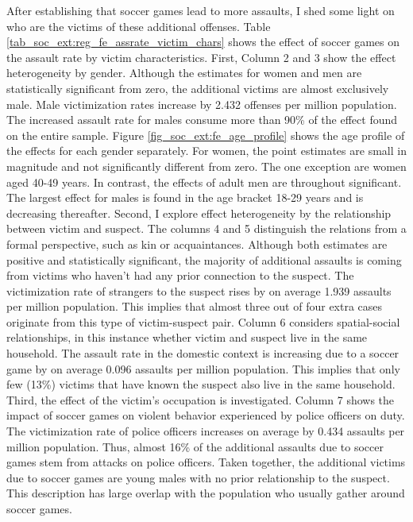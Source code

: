 \documentclass[11pt, a4paper]{article} %
\begin{document}
After establishing that soccer games lead to more assaults, I shed some light on who are the victims of these additional offenses. Table \ref{tab_soc_ext:reg_fe_assrate_victim_chars} shows the effect of soccer games on the assault rate by victim characteristics. First, Column 2 and 3 show the effect heterogeneity by gender. Although the estimates for women and men are statistically significant from zero, the additional victims are almost exclusively male. Male victimization rates increase by 2.432 offenses per million population. The increased assault rate for males consume more than 90\% of the effect found on the entire sample. Figure \ref{fig_soc_ext:fe_age_profile} shows the age profile of the effects for each gender separately. For women, the point estimates are small in magnitude and not significantly different from zero. The one exception are women aged 40-49 years. In contrast, the effects of adult men are throughout significant. The largest effect for males is found in the age bracket 18-29 years and is decreasing thereafter. Second, I explore effect heterogeneity by the relationship between victim and suspect. The columns 4 and 5 distinguish the relations from a formal perspective, such as kin or acquaintances. Although both estimates are positive and statistically significant, the majority of additional assaults is coming from victims who haven't had any prior connection to the suspect. The victimization rate of strangers to the suspect rises by on average 1.939 assaults per million population. This implies that almost three out of four extra cases originate from this type of victim-suspect pair. Column 6 considers spatial-social relationships, in this instance whether victim and suspect live in the same household. The assault rate in the domestic context is increasing due to a soccer game by on average 0.096 assaults per million population. This implies that only few (13\%) victims that have known the suspect also live in the same household. Third, the effect of the victim's occupation is investigated. Column 7 shows the impact of soccer games on violent behavior experienced by police officers on duty. The victimization rate of police officers increases on average by 0.434 assaults per million population. Thus, almost 16\% of the additional assaults due to soccer games stem from attacks on police officers. Taken together, the additional victims due to soccer games are young males with no prior relationship to the suspect. This description has large overlap with the population who usually gather around soccer games.
\end{document}
